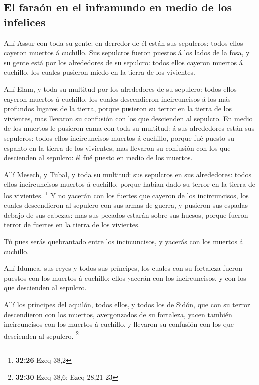 \hypertarget{el-farauxf3n-en-el-inframundo-en-medio-de-los-infelices}{%
\subsection{El faraón en el inframundo en medio de los
infelices}\label{el-farauxf3n-en-el-inframundo-en-medio-de-los-infelices}}

 Allí Assur con toda su gente: en derredor de él están sus
sepulcros: todos ellos cayeron muertos á cuchillo.  Sus
sepulcros fueron puestos á los lados de la fosa, y su gente está por los
alrededores de su sepulcro: todos ellos cayeron muertos á cuchillo, los
cuales pusieron miedo en la tierra de los vivientes.

 Allí Elam, y toda su multitud por los alrededores de su
sepulcro: todos ellos cayeron muertos á cuchillo, los cuales
descendieron incircuncisos á los más profundos lugares de la tierra,
porque pusieron su terror en la tierra de los vivientes, mas llevaron su
confusión con los que descienden al sepulcro.  En medio de
los muertos le pusieron cama con toda su multitud: á sus alrededores
están sus sepulcros: todos ellos incircuncisos muertos á cuchillo,
porque fué puesto su espanto en la tierra de los vivientes, mas llevaron
su confusión con los que descienden al sepulcro: él fué puesto en medio
de los muertos.

 Allí Mesech, y Tubal, y toda su multitud: sus sepulcros en
sus alrededores: todos ellos incircuncisos muertos á cuchillo, porque
habían dado su terror en la tierra de los vivientes. \footnote{\textbf{32:26}
  Ezeq 38,2}  Y no yacerán con los fuertes que cayeron de
los incircuncisos, los cuales descendieron al sepulcro con sus armas de
guerra, y pusieron sus espadas debajo de sus cabezas: mas sus pecados
estarán sobre sus huesos, porque fueron terror de fuertes en la tierra
de los vivientes.

 Tú pues serás quebrantado entre los incircuncisos, y
yacerás con los muertos á cuchillo.

 Allí Idumea, sus reyes y todos sus príncipes, los cuales
con su fortaleza fueron puestos con los muertos á cuchillo: ellos
yacerán con los incircuncisos, y con los que descienden al sepulcro.

 Allí los príncipes del aquilón, todos ellos, y todos los
de Sidón, que con su terror descendieron con los muertos, avergonzados
de su fortaleza, yacen también incircuncisos con los muertos á cuchillo,
y llevaron su confusión con los que descienden al sepulcro. \footnote{\textbf{32:30}
  Ezeq 38,6; Ezeq 28,21-23}

